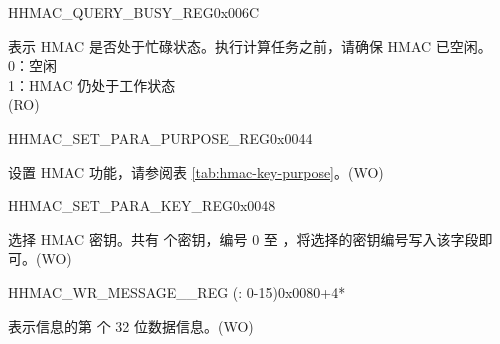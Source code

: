 \begin{register}{H}{HMAC\_QUERY\_BUSY\_REG}{0x006C}\label{regdesc:HMACQUERYBUSYREG}
%
%
\regnewline%
\begin{regdesc}\begin{reglist}
\label{fielddesc:HMACBUSYSTATE}\item [HMAC\_BUSY\_STATE] 表示 HMAC 是否处于忙碌状态。执行计算任务之前，请确保 HMAC 已空闲。
\\0：空闲
\\1：HMAC 仍处于工作状态
\\(RO)
\end{reglist}\end{regdesc}
\end{register}


\begin{register}{H}{HMAC\_SET\_PARA\_PURPOSE\_REG}{0x0044}\label{regdesc:HMACSETPARAPURPOSEREG}
%
%
\regnewline%
\begin{regdesc}\begin{reglist}
\label{fielddesc:HMACPURPOSESET}\item [HMAC\_PURPOSE\_SET] 设置 HMAC 功能，请参阅表 \ref{tab:hmac-key-purpose}。(WO)
\end{reglist}\end{regdesc}
\end{register}


\begin{register}{H}{HMAC\_SET\_PARA\_KEY\_REG}{0x0048}\label{regdesc:HMACSETPARAKEYREG}
%
%
\regnewline%
\begin{regdesc}\begin{reglist}
\label{fielddesc:HMACKEYSET}\item [HMAC\_KEY\_SET] 选择 HMAC 密钥。共有  个密钥，编号 0 至 ，将选择的密钥编号写入该字段即可。(WO)
\end{reglist}\end{regdesc}
\end{register}


\begin{register}{H}{HMAC\_WR\_MESSAGE\_\_REG (: 0-15)}{0x0080+4*}\label{regdesc:HMACWRMESSAGENREG}
%
\regnewline%
\begin{regdesc}\begin{reglist}
\label{fielddesc:HMACWDATAN}\item [HMAC\_WDATA\_\regindex{n}] 表示信息的第  个 32 位数据信息。(WO)
\end{reglist}\end{regdesc}
\end{register}

